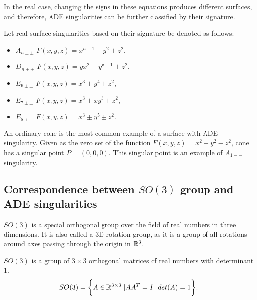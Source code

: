 In the real case, changing the signs in these equations produces different
surfaces, and therefore, ADE singularities can be further classified by their
signature.

\begin{definition}
    Let real surface singularities based on their signature be denoted as follows:
    \begin{itemize}
        \item $A_{n\pm\pm}$ \hspace{5mm} $F(x,y,z)=x^{n+1}\pm y^2\pm z^2$,
              
        \item $D_{n\pm\pm}$ \hspace{5mm} $F(x,y,z)=yx^2\pm y^{n-1}\pm z^2$,
        
        \item $E_{6\pm\pm}$ \hspace{5mm} $F(x,y,z)=x^3\pm y^4\pm z^2$,
        
        \item $E_{7\pm\pm}$ \hspace{5mm} $F(x,y,z)=x^3\pm xy^3\pm z^2$,
        
        \item $E_{8\pm\pm}$ \hspace{5mm} $F(x,y,z)=x^3\pm y^5\pm z^2$.
        \end{itemize}
\end{definition}

An ordinary cone is the most common example of a surface with ADE singularity.
Given as the zero set of the function $F(x, y, z)=x^2-y^2-z^2$, cone has
a singular point $P=(0, 0, 0)$. This singular point is an example of $A_{1--}$
singularity.

\subsection{Correspondence between $SO(3)$ group and ADE singularities}
\label{subs2.2.2}
$SO(3)$ is a special orthogonal group over the field of real numbers 
in three dimensions. It is also called a $3$D rotation group, as it is a group
of all rotations around axes passing through the origin in $\mathbb{R}^3$.
\begin{definition}
    $SO(3)$ is a group of $3\times3$ orthogonal matrices
    of real numbers with determinant $1$.
    $$SO(3) = \bigg\{A\in\mathbb{R}^{3\times3} \hspace{1mm} | AA^T=I ,\hspace{1mm} det(A)=1\bigg\}.$$
\end{definition}

